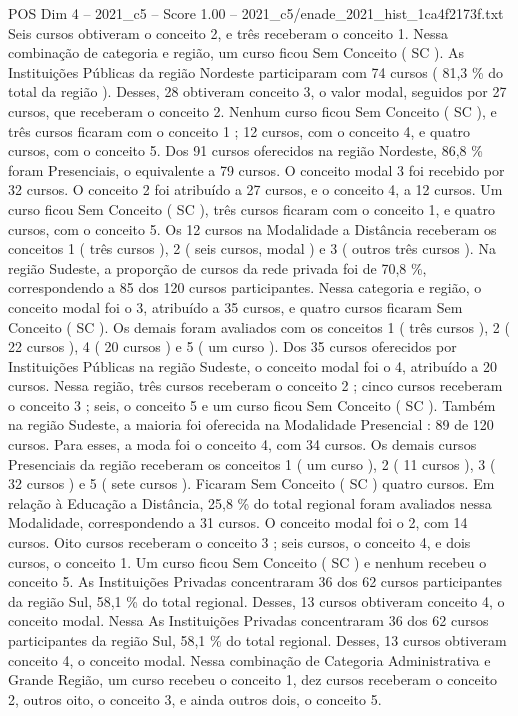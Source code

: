 \begin{textsample}{POS Dim 4 – 2021\_c5 – Score 1.00 – 2021\_c5/enade\_2021\_hist\_1ca4f2173f.txt}
Seis cursos obtiveram o conceito 2, e três receberam o conceito 1.
Nessa combinação de categoria e região, um curso ficou Sem Conceito ( SC ).
As Instituições Públicas da região Nordeste participaram com 74 cursos ( 81,3 \% do total da região ).
Desses, 28 obtiveram conceito 3, o valor modal, seguidos por 27 cursos, que receberam o conceito 2.
Nenhum curso ficou Sem Conceito ( SC ), e três cursos ficaram com o conceito 1 ; 12 cursos, com o conceito 4, e quatro cursos, com o conceito 5.
Dos 91 cursos oferecidos na região Nordeste, 86,8 \% foram Presenciais, o equivalente a 79 cursos.
O conceito modal 3 foi recebido por 32 cursos.
O conceito 2 foi atribuído a 27 cursos, e o conceito 4, a 12 cursos.
Um curso ficou Sem Conceito ( SC ), três cursos ficaram com o conceito 1, e quatro cursos, com o conceito 5.
Os 12 cursos na Modalidade a Distância receberam os conceitos 1 ( três cursos ), 2 ( seis cursos, modal ) e 3 ( outros três cursos ).
Na região Sudeste, a proporção de cursos da rede privada foi de 70,8 \%, correspondendo a 85 dos 120 cursos participantes.
Nessa categoria e região, o conceito modal foi o 3, atribuído a 35 cursos, e quatro cursos ficaram Sem Conceito ( SC ).
Os demais foram avaliados com os conceitos 1 ( três cursos ), 2 ( 22 cursos ), 4 ( 20 cursos ) e 5 ( um curso ).
Dos 35 cursos oferecidos por Instituições Públicas na região Sudeste, o conceito modal foi o 4, atribuído a 20 cursos.
Nessa região, três cursos receberam o conceito 2 ; cinco cursos receberam o conceito 3 ; seis, o conceito 5 e um curso ficou Sem Conceito ( SC ).
Também na região Sudeste, a maioria foi oferecida na Modalidade Presencial : 89 de 120 cursos.
Para esses, a moda foi o conceito 4, com 34 cursos.
Os demais cursos Presenciais da região receberam os conceitos 1 ( um curso ), 2 ( 11 cursos ), 3 ( 32 cursos ) e 5 ( sete cursos ).
Ficaram Sem Conceito ( SC ) quatro cursos.
Em relação à Educação a Distância, 25,8 \% do total regional foram avaliados nessa Modalidade, correspondendo a 31 cursos.
O conceito modal foi o 2, com 14 cursos.
Oito cursos receberam o conceito 3 ; seis cursos, o conceito 4, e dois cursos, o conceito 1.
Um curso ficou Sem Conceito ( SC ) e nenhum recebeu o conceito 5.
As Instituições Privadas concentraram 36 dos 62 cursos participantes da região Sul, 58,1 \% do total regional.
Desses, 13 cursos obtiveram conceito 4, o conceito modal.
Nessa As Instituições Privadas concentraram 36 dos 62 cursos participantes da região Sul, 58,1 \% do total regional.
Desses, 13 cursos obtiveram conceito 4, o conceito modal.
Nessa combinação de Categoria Administrativa e Grande Região, um curso recebeu o conceito 1, dez cursos receberam o conceito 2, outros oito, o conceito 3, e ainda outros dois, o conceito 5.

\end{textsample}
